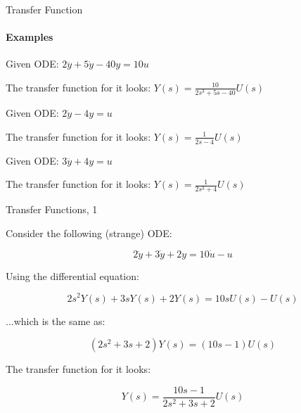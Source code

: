 \documentclass{beamer}
\begin{document}
\begin{frame}{Transfer Function}
\framesubtitle{Examples}
\begin{flushleft}

\begin{example}
Given ODE: $2 \dddot y + 5\dot y - 40 y = 10 u$

The transfer function for it looks: 
$Y(s)  = \frac{10}{2 s^3 + 5 s - 40} U(s)$
\end{example}


\begin{example}
Given ODE: $2 \dot y - 4 y = u$

The transfer function for it looks: $Y(s) = \frac{1}{2 s - 4} U(s)$
\end{example}


\begin{example}
Given ODE: $3 \dddot y + 4y = u$

The transfer function for it looks: $Y(s) = \frac{1}{2 s^3 + 4} U(s)$
\end{example}

\end{flushleft}
\end{frame}




\begin{frame}{Transfer Functions, 1}
\begin{flushleft}

Consider the following (strange) ODE:

\begin{equation}
2 \ddot y + 3 \dot y + 2 y = 10 \dot u - u
\end{equation}

Using the differential equation:

\begin{equation}
2 s^2 Y(s) + 3s Y(s) + 2Y(s) = 10s U(s) - U(s)
\end{equation}

...which is the same as:

\begin{equation}
(2s^2 + 3s + 2) Y(s) = (10s - 1)U(s)
\end{equation}

The transfer function for it looks: 

\begin{equation}
Y(s) = \frac{10s - 1}{2s^2 + 3s + 2} U(s)
\end{equation}

\end{flushleft}
\end{frame}
\end{document}
